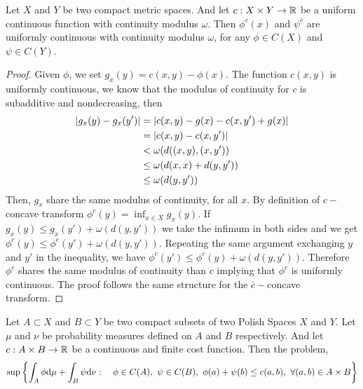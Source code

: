 \begin{lemma}
	Let $X$ and $Y$ be two compact metric spaces. And let $c:X\times Y \rightarrow \mathbb{R}$ be a uniform continuous function with continuity modulus $\omega$. Then $\phi^c(x)$ and $\psi^{\bar{c}}$ are uniformly continuous with continuity modulus $\omega$, for any $\phi\in C(X)$ and $\psi\in C(Y)$.
\end{lemma}
\begin{proof}
	Given $\phi$, we set $g_x(y)=c(x,y)-\phi(x)$. The function $c(x,y)$ is uniformly continuous, we know that the modulus of continuity for $c$ is subadditive and nondecreasing, then
	\begin{align*}	
	\left| g_x(y)-g_x(y') \right|&=\left| c(x,y)-g(x)-c(x,y')+g(x) \right|\\
	&=\left| c(x,y)-c(x,y') \right|\\
&<\omega(d((x,y),(x,y'))\\
	&\leq\omega(d(x,x)+d(y,y'))\\
	&\leq\omega(d(y,y'))
	\end{align*} 
 Then, $g_x$ share the same modulus of continuity, for all $x$. By definition of $c-$concave transform  $\phi^c(y)=\inf_{x\in X} g_x(y)$. If $g_x(y)\leq g_x(y')+\omega(d(y,y'))$ we take the infimum in both sides and we get $\phi^c(y)\leq \phi^c(y')+\omega(d(y,y'))$. Repeating the same argument exchanging $y$ and $y'$ in the inequality, we have $\phi^c(y')\leq \phi^c(y)+\omega(d(y,y'))$. Therefore $\phi^c$ shares the same modulus of continuity than $c$ implying that $\phi^c$ is uniformly continuous. The proof follows the same structure for the $\bar{c}-$concave transform. 
\end{proof}
\begin{theorem}
	Let $A\subset X$ and $B\subset Y$ be two compact subsets of two Polish Spaces $X$ and $Y$. Let $\mu$ and $\nu$ be probability measures defined on $A$ and $B$ respectively. And let $c:A\times B\rightarrow \mathbb{R}$ be a continuous and finite cost function. Then the problem, 
	\begin{equation*}
		\sup\braces{\int_A \phi \dmu+\int_B \psi \dnu:\quad \phi\in C(A),\ \psi \in C(B),\ \phi(a)+\psi(b)\leq c(a,b),\ \forall (a,b)\in A\times B}
	\end{equation*} 
\end{theorem}
